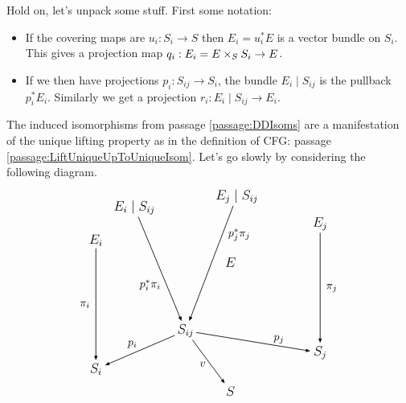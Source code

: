 \documentclass[12pt]{memoir}
\newcounter{passage}
\begin{document}
\begin{ptcb}
    Hold on, let's unpack some stuff. First some notation:
    \begin{itemize}
        \item If the covering maps are \(u_i:S_i\to S\) then \(E_i=u_i^\ast E\) is a vector bundle on \(S_i\). This gives a projection map \(q_i:E_i=E\times_SS_i\to E\).
        \item If we then have projections \(p_i:S_{ij}\to S_i\), the bundle \(E_i\mid S_{ij}\) is the pullback \(p_i^\ast E_i\). Similarly we get a projection \(r_i:E_i\mid S_{ij}\to E_i\).
    \end{itemize}
    The induced isomorphisms from passage \ref{passage:DDIsoms} are a manifestation of the unique lifting property as in the definition of CFG: passage \ref{passage:LiftUniqueUpToUniqueIsom}. Let's go slowly by considering the following diagram.
    \[
    \begin{tikzpicture}[
        y=.86cm,
        arrows={-{Latex[length=1.6mm]}},
        line width=.6pt,
        every node/.style={inner sep=2pt,font=\large}
    ]
        \node (Si)  at (0,0)       {$S_i$};
        \node (Sij) at (2.8,1.4)   {$S_{ij}$};
        \node (Sj)  at (7,.6)      {$S_j$};
        \node (S)   at (4.2,-.8)   {$S$};

        \node (Ei)   at (0,4.7)    {$E_i$};
        \node (Eiij) at (1.2,5.9)  {$E_i\mid S_{ij}$};
        \node (Ejij) at (4.4,6.3)  {$E_j\mid S_{ij}$};
        \node (Ej)   at (7,5.3)    {$E_j$};
        \node (E)    at (4.2,3.9)  {$E$};

        \begin{scope}[every node/.append style={font=\normalsize}]
        \draw (Sij) -- node[above left] {$p_i$} (Si);
        \draw (Sij) -- node[pos=.72,above] {$p_j$} (Sj);
        \draw (Sij) -- node[pos=.55,left,xshift=-.2em] {$v$} (S);

        \draw (Eiij) -- node[pos=.65,left,xshift=-.3em]
            {$p_i^*\pi_i$} (Sij);
        \draw (Ejij) -- node[pos=.25,right,xshift=.3em]
            {$p_j^*\pi_j$} (Sij);
        \draw (Ei) -- node[left,xshift=-.3em] {$\pi_i$} (Si);
        \draw (Ej) -- node[right,xshift=.3em] {$\pi_j$} (Sj);


\end{scope}
\end{tikzpicture}\]
\end{ptcb}
\end{document}
